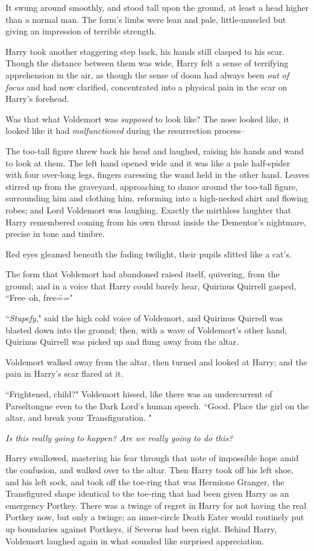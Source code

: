 It swung around smoothly, and stood tall upon the ground, at least a head higher than a normal man. The form's limbs were lean and pale, little-muscled but giving an impression of terrible strength.

Harry took another staggering step back, his hands still clasped to his scar. Though the distance between them was wide, Harry felt a sense of terrifying apprehension in the air, as though the sense of doom had always been \emph{out of focus} and had now clarified, concentrated into a physical pain in the scar on Harry's forehead.

Was that what Voldemort was \emph{supposed} to look like? The nose looked like, it looked like it had \emph{malfunctioned} during the resurrection process\---

The too-tall figure threw back his head and laughed, raising his hands and wand to look at them. The left hand opened wide and it was like a pale half-spider with four over-long legs, fingers caressing the wand held in the other hand. Leaves stirred up from the graveyard, approaching to dance around the too-tall figure, surrounding him and clothing him, reforming into a high-necked shirt and flowing robes; and Lord Voldemort was laughing. Exactly the mirthless laughter that Harry remembered coming from his own throat inside the Dementor's nightmare, precise in tone and timbre.

Red eyes gleamed beneath the fading twilight, their pupils slitted like a cat's.

The form that Voldemort had abandoned raised itself, quivering, from the ground; and in a voice that Harry could barely hear, Quirinus Quirrell gasped, ``Free\---oh, free\==="

``\emph{Stupefy}," said the high cold voice of Voldemort, and Quirinus Quirrell was blasted down into the ground; then, with a wave of Voldemort's other hand, Quirinus Quirrell was picked up and flung away from the altar.

Voldemort walked away from the altar, then turned and looked at Harry; and the pain in Harry's scar flared at it.

``Frightened, child?" Voldemort hissed, like there was an undercurrent of Parseltongue even to the Dark Lord's human speech. ``Good. Place the girl on the altar, and break your Transfiguration. "

\emph{Is this really going to happen? Are we really going to do this?}

Harry swallowed, mastering his fear through that note of impossible hope amid the confusion, and walked over to the altar. Then Harry took off his left shoe, and his left sock, and took off the toe-ring that was Hermione Granger, the Transfigured shape identical to the toe-ring that had been given Harry as an emergency Portkey. There was a twinge of regret in Harry for not having the real Portkey now, but only a twinge; an inner-circle Death Eater would routinely put up boundaries against Portkeys, if Severus had been right. Behind Harry, Voldemort laughed again in what sounded like surprised appreciation.

